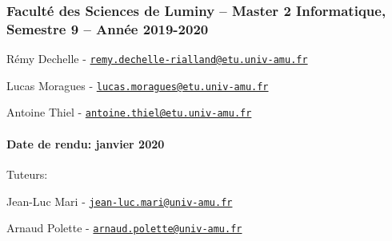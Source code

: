 \subsubsection*{Faculté des Sciences de Luminy – Master 2 Informatique, Semestre 9 – Année 2019-\/2020}


\begin{DoxyItemize}
\item Rémy Dechelle -\/ \href{mailto:remy.dechelle-rialland@etu.univ-amu.fr}{\tt remy.\+dechelle-\/rialland@etu.\+univ-\/amu.\+fr}
\item Lucas Moragues -\/ \href{mailto:lucas.moragues@etu.univ-amu.fr}{\tt lucas.\+moragues@etu.\+univ-\/amu.\+fr}
\item Antoine Thiel -\/ \href{mailto:antoine.thiel@etu.univ-amu.fr}{\tt antoine.\+thiel@etu.\+univ-\/amu.\+fr}
\end{DoxyItemize}

\paragraph*{Date de rendu\+: janvier 2020}

Tuteurs\+:


\begin{DoxyItemize}
\item Jean-\/\+Luc Mari -\/ \href{mailto:jean-luc.mari@univ-amu.fr}{\tt jean-\/luc.\+mari@univ-\/amu.\+fr}
\item Arnaud Polette -\/ \href{mailto:arnaud.polette@univ-amu.fr}{\tt arnaud.\+polette@univ-\/amu.\+fr} 
\end{DoxyItemize}